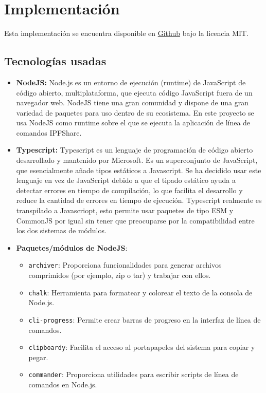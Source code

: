 \section{Implementación}
Esta implementación se encuentra disponible en \href{https://github.com/nicocossiom/ipfshare}{Github} bajo la licencia MIT.
\subsection{Tecnologías usadas}\label{ssect:tecnologias}
\begin{itemize}[noitemsep,after=\vspace{-0.4\baselineskip}]
  \item \textbf{NodeJS:} Node.js es un entorno de ejecución (runtime) de JavaScript de código abierto, multiplataforma, que ejecuta código JavaScript fuera de un navegador web.
        NodeJS tiene una gran comunidad y dispone de una gran variedad de paquetes para uso dentro de su ecosistema. En este proyecto se usa NodeJS como runtime sobre el que se ejecuta la aplicación de línea de comandos IPFShare.
  \item \textbf{Typescript:} Typescript es un lenguaje de programación de código abierto desarrollado y mantenido por Microsoft. Es un superconjunto de JavaScript, que esencialmente añade tipos estáticos a Javascript. Se ha decidido usar este lenguaje en vez de JavaScript debido a que el tipado estático ayuda a detectar errores en tiempo de compilación, lo que facilita el desarrollo y reduce la cantidad de errores en tiempo de ejecución. Typescript realmente es transpilado a Javascriopt, esto permite usar
        paquetes de tipo ESM y CommonJS por igual sin tener que preocuparse por la compatibilidad entre los dos sistemas de módulos.
  \item \textbf{Paquetes/módulos de NodeJS}:
        \begin{itemize}[noitemsep]
          \item \texttt{archiver}: Proporciona funcionalidades para generar archivos comprimidos (por ejemplo, zip o tar) y trabajar con ellos.
          \item \texttt{chalk}: Herramienta para formatear y colorear el texto de la consola de Node.js.
          \item \texttt{cli-progress}: Permite crear barras de progreso en la interfaz de línea de comandos.
          \item \texttt{clipboardy}: Facilita el acceso al portapapeles del sistema para copiar y pegar.
          \item \texttt{commander}: Proporciona utilidades para escribir scripts de línea de comandos en Node.js.

\end{itemize}
\end{itemize}
